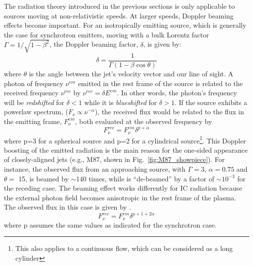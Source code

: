 The radiation theory introduced in the previous sections is only applicable to sources moving at non-relativistic speeds. At larger speeds, Doppler beaming effects become important. For an isotropically emitting source, which is generally the case for synchrotron emitters, moving with a bulk Lorentz factor $\Gamma=1/\sqrt{1-\beta^2}$, the Doppler beaming factor, $\delta$, is given by:
\begin{equation}
    \delta = \frac{1}{\Gamma(1-\beta\cos{\theta})}
\end{equation}
where $\theta$ is the angle between the jet's velocity vector and our line of sight. A photon of frequency $\nu^{em}$ emitted in the rest frame of the source is related to the received frequency $\nu^{rec}$ by $\nu^{rec}= \delta E^{em}$. 
In other words, the photon's frequency will be \textit{redshifted} for $\delta<1$ while it is \textit{blueshifted} for $\delta>1$. If the source exhibits a powerlaw spectrum, ($F_\nu\propto\nu^{-\alpha}$), the received flux would be related to the flux in the emitting frame, $F^{em}_{{\nu}}$, both evaluated at the observed frequency by \citep[e.g.,][]{dermer1995beaming}
\begin{equation}\label{eq:flux}
    F^{rec}_{\nu}=F^{em}_{{\nu}}\delta^{p+\alpha}
\end{equation}
where p=3 for a spherical source and p=2 for a cylindrical source\footnote{This also applies to a continuous flow, which can be considered as a long cylinder}.
This Doppler boosting of the emitted radiation is the main reason for the one-sided appearance of closely-aligned jets (e.g., M87, shown in Fig.~\ref{fig:M87_showpiece}). For instance, the observed flux from an approaching source, with $\Gamma=3$, $\alpha=0.75$ and $\theta=$ 15\textdegree, is beamed by $\sim$140 times, while is ``de-beamed'' by a factor of $\sim$$10^{-3}$ for the receding case. The beaming effect works differently for IC radiation because the external photon field becomes anisotropic in the rest frame of the plasma. The observed flux in this case is given by \citep[e.g.,][]{dermer1995beaming,georganopoulos2001beaming}.
\begin{equation}\label{eq:ic_beaming}
    F^{rec}_{\nu}=F^{em}_{{\nu}}\delta^{p+1+2\alpha}
\end{equation}
where p assumes the same values as indicated for the synchrotron case. 


